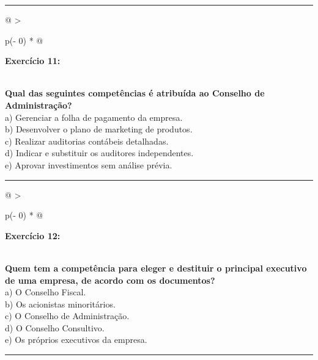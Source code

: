 \documentclass[
]{book}
\begin{document}
\begin{center}\rule{0.5\linewidth}{0.5pt}\end{center}

\begin{longtable}[]{@{}
  >{\raggedright\arraybackslash}p{(\columnwidth - 0\tabcolsep) * }@{}}
\toprule\noalign{}
\begin{minipage}[b]{\linewidth}\raggedright
\textbf{Exercício 11:}
\end{minipage} \\
\midrule\noalign{}
\endhead
\bottomrule\noalign{}
\endlastfoot
\textbf{Qual das seguintes competências é atribuída ao Conselho de Administração?} \\
a) Gerenciar a folha de pagamento da empresa. \\
b) Desenvolver o plano de marketing de produtos. \\
c) Realizar auditorias contábeis detalhadas. \\
d) Indicar e substituir os auditores independentes. \\
e) Aprovar investimentos sem análise prévia. \\
\end{longtable}

\begin{center}\rule{0.5\linewidth}{0.5pt}\end{center}

\begin{longtable}[]{@{}
  >{\raggedright\arraybackslash}p{(\columnwidth - 0\tabcolsep) * }@{}}
\toprule\noalign{}
\begin{minipage}[b]{\linewidth}\raggedright
\textbf{Exercício 12:}
\end{minipage} \\
\midrule\noalign{}
\endhead
\bottomrule\noalign{}
\endlastfoot
\textbf{Quem tem a competência para eleger e destituir o principal executivo de uma empresa, de acordo com os documentos?} \\
a) O Conselho Fiscal. \\
b) Os acionistas minoritários. \\
c) O Conselho de Administração. \\
d) O Conselho Consultivo. \\
e) Os próprios executivos da empresa. \\
\end{longtable}

\begin{center}\rule{0.5\linewidth}{0.5pt}\end{center}
\end{document}
